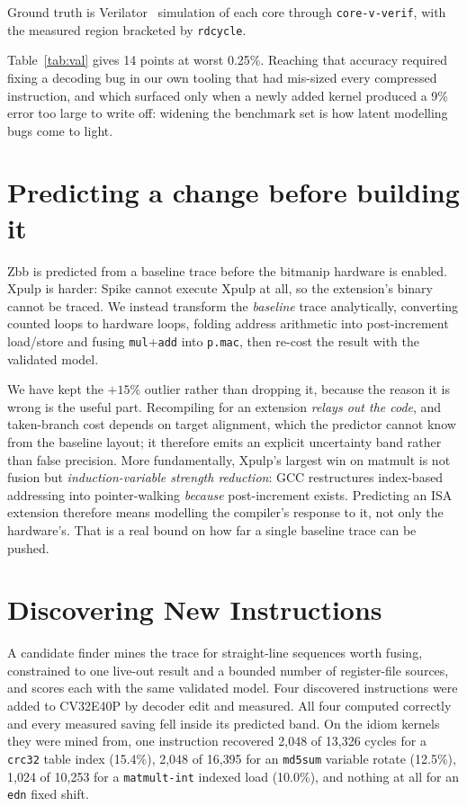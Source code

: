 \documentclass[conference,10pt]{IEEEtran}
\begin{document}
Ground truth is Verilator~\cite{verilator} simulation of each core through
\texttt{core-v-verif}, with the measured region bracketed by \texttt{rdcycle}.

Table~\ref{tab:val} gives 14 points at worst 0.25\%. Reaching that accuracy
required fixing a decoding bug in our own tooling that had mis-sized every
compressed instruction, and which surfaced only when a newly added kernel
produced a 9\% error too large to write off: widening the benchmark set is how
latent modelling bugs come to light.

\section{Predicting a change before building it}

Zbb is predicted from a baseline trace before the bitmanip hardware is enabled.
Xpulp is harder: Spike cannot execute Xpulp at all, so the extension's binary
cannot be traced. We instead transform the \emph{baseline} trace analytically, converting counted
loops to hardware loops, folding address arithmetic into post-increment
load/store and fusing \texttt{mul}+\texttt{add} into \texttt{p.mac}, then re-cost
the result with the validated model.

We have kept the $+15\%$ outlier rather than dropping it, because the reason it
is wrong is the useful part.
Recompiling for an extension \emph{relays out the code}, and taken-branch cost
depends on target alignment, which the predictor cannot know from the baseline
layout; it therefore emits an explicit uncertainty band rather than false
precision. More fundamentally, Xpulp's largest win on matmult is not fusion but
\emph{induction-variable strength reduction}: GCC restructures index-based
addressing into pointer-walking \emph{because} post-increment exists.
Predicting an ISA extension therefore means modelling the compiler's response to
it, not only the hardware's. That is a real bound on how far a single baseline
trace can be pushed.

\section{Discovering New Instructions}

A candidate finder mines the trace for straight-line sequences worth fusing,
constrained to one live-out result and a bounded number of register-file
sources, and scores each with the same validated model. Four discovered
instructions were added to CV32E40P by decoder edit and measured. All four
computed correctly and every measured saving fell inside its predicted band. On
the idiom kernels they were mined from, one instruction recovered 2{,}048 of
13{,}326 cycles for a \texttt{crc32} table index (15.4\%), 2{,}048 of 16{,}395
for an \texttt{md5sum} variable rotate (12.5\%), 1{,}024 of 10{,}253 for a
\texttt{matmult-int} indexed load (10.0\%), and nothing at all for an
\texttt{edn} fixed shift.
\end{document}
